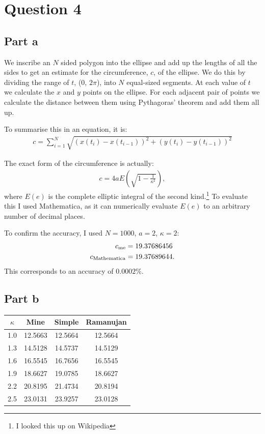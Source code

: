\documentclass[12pt]{article}
\begin{document}
\section*{Question 4}
\subsection*{Part a}
We inscribe an $N$ sided polygon into the ellipse and add up the lengths of all the sides to get an estimate for the circumference, $c$, of the ellipse.
We do this by dividing the range of $t$, (0, $2 \pi$), into $N$ equal-sized segments.
At each value of $t$ we calculate the $x$ and $y$ points on the ellipse.
For each adjacent pair of points we calculate the distance between them using Pythagoras' theorem and add them all up.

To summarise this in an equation, it is:
\begin{align}
	c = \sum_{i=1}^{N} \sqrt{\left(x(t_i) - x(t_{i-1})\right)^2 + \left(y(t_i) - y(t_{i-1})\right)^2}
\end{align}

The exact form of the circumference is actually:
\begin{align}
c = 4 a E\left(\sqrt{1 - \frac{1}{\kappa^2}}\right),
\end{align}
where $E(e)$ is the complete elliptic integral of the second kind.\footnote{I looked this up on Wikipedia}
To evaluate this I used Mathematica, as it can numerically evaluate $E(e)$ to an arbitrary number of decimal places.

To confirm the accuracy, I used $N=1000$, $a=2$, $\kappa = 2$:
\begin{align}
	c_\textnormal{me} &= 19.37686456 \\
	c_\textnormal{Mathematica} &= 19.37689644.
\end{align}
This corresponds to an accuracy of $0.0002\%$. 

\subsection*{Part b}
\begin{tabular}{c | c | c | c}
$\kappa$ & Mine & Simple & Ramanujan \\
\hline
1.0 & 12.5663 & 12.5664 & 12.5664 \\
1.3 & 14.5128 & 14.5737 & 14.5129 \\
1.6 & 16.5545 & 16.7656 & 16.5545 \\
1.9 & 18.6627 & 19.0785 & 18.6627 \\
2.2 & 20.8195 & 21.4734 & 20.8194 \\
2.5 & 23.0131 & 23.9257 & 23.0128
\end{tabular}
\end{document}
